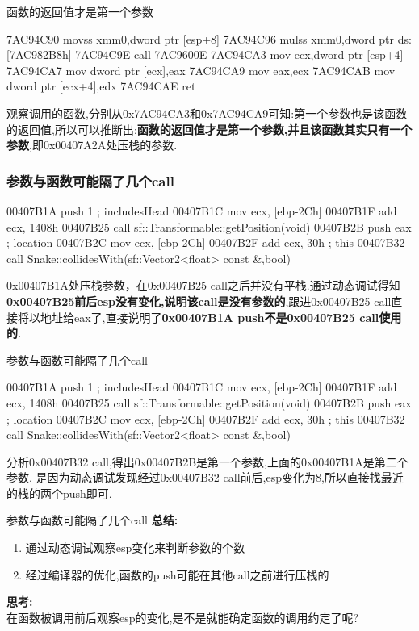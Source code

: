 \documentclass[AutoFakeBold,AutoFakeSlant]{beamer}
\begin{document}
	\begin{frame}[fragile]{函数的返回值才是第一个参数}
		\begin{x86asmcode}
7AC94C90  movss  xmm0,dword ptr [esp+8]  
7AC94C96  mulss  xmm0,dword ptr ds:[7AC982B8h]  
7AC94C9E  call   7AC9600E  
7AC94CA3  mov    ecx,dword ptr [esp+4]  
7AC94CA7  mov    dword ptr [ecx],eax  
7AC94CA9  mov    eax,ecx  
7AC94CAB  mov    dword ptr [ecx+4],edx  
7AC94CAE  ret \end{x86asmcode}
		观察调用的函数,分别从0x7AC94CA3和0x7AC94CA9可知:第一个参数也是该函数的返回值,所以可以推断出:\textbf{函数的返回值才是第一个参数,并且该函数其实只有一个参数},即0x00407A2A处压栈的参数.
	\end{frame}
	
	
	\begin{frame}[fragile]
		\frametitle{参数与函数可能隔了几个call}
		\begin{x86asmcode}
00407B1A  push    1 ; includesHead
00407B1C  mov     ecx, [ebp-2Ch]
00407B1F  add     ecx, 1408h
00407B25  call    sf::Transformable::getPosition(void)
00407B2B  push    eax ; location
00407B2C  mov     ecx, [ebp-2Ch]
00407B2F  add     ecx, 30h ; this
00407B32  call    Snake::collidesWith(sf::Vector2<float> const &,bool)\end{x86asmcode}
		0x00407B1A处压栈参数，在0x00407B25 call之后并没有平栈.通过动态调试得知\textbf{0x00407B25前后esp没有变化,说明该call是没有参数的},跟进0x00407B25 call直接将以地址给eax了,直接说明了\textbf{0x00407B1A push不是0x00407B25 call使用的}.	
	\end{frame}
	
		\begin{frame}[fragile]{参数与函数可能隔了几个call}
		\begin{x86asmcode}
00407B1A  push    1 ; includesHead
00407B1C  mov     ecx, [ebp-2Ch]
00407B1F  add     ecx, 1408h
00407B25  call    sf::Transformable::getPosition(void)
00407B2B  push    eax ; location
00407B2C  mov     ecx, [ebp-2Ch]
00407B2F  add     ecx, 30h ; this
00407B32  call    Snake::collidesWith(sf::Vector2<float> const &,bool)\end{x86asmcode}
		分析0x00407B32 call,得出0x00407B2B是第一个参数,上面的0x00407B1A是第二个参数.	是因为动态调试发现经过0x00407B32 call前后,esp变化为8,所以直接找最近的栈的两个push即可.
	\end{frame}
	
	\begin{frame}[fragile]{参数与函数可能隔了几个call}
		\textbf{总结:}
		\begin{enumerate}
			\item 通过动态调试观察esp变化来判断参数的个数
			\item 经过编译器的优化,函数的push可能在其他call之前进行压栈的
		\end{enumerate}
		\textbf{思考:} \\ 
		在函数被调用前后观察esp的变化,是不是就能确定函数的调用约定了呢?
	\end{frame}
	
\end{document}

